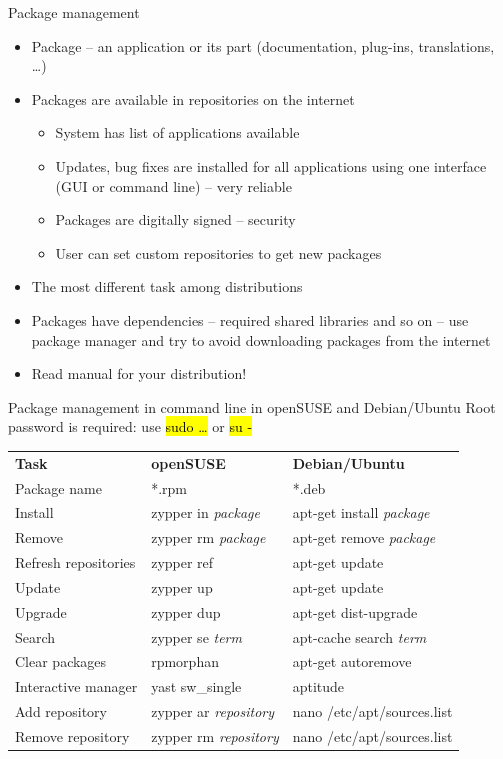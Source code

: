 \documentclass[compress, ucs, xelatex, 11pt, xcolor=svgnames,
  hyperref={
    bookmarks=true,
    unicode=true,
    colorlinks=true,
    pdftitle={Linux, command line and MetaCentrum},
    plainpages=false,
    pdfauthor={Vojtech Zeisek},
    pdfsubject={Course about use of Linux command line, writing shell scripts and using MetaCentrum of CESNET},
    pdfcreator={XeLaTeX},
    pdfkeywords={Linux, GNU, BASH, shell, command line, MetaCentrum},
    linkcolor=Red,
    anchorcolor=Blue,
    citecolor=Purple,
    filecolor=DodgerBlue,
    menucolor=DarkOrchid,
    urlcolor=DeepSkyBlue,
    pdftex},
  url={hyphens, lowtilde} %
  ]{beamer}
\renewcommand{\texttt}[1]{\hl{\ttfamily #1}}
\begin{document}
\begin{frame}{Package management}
\begin{itemize}
  \item Package -- an application or its part (documentation, plug-ins, translations, \ldots)
  \item Packages are available in repositories on the internet
  \begin{itemize}
    \item System has list of applications available
    \item Updates, bug fixes are installed for all applications using one interface (GUI or command line) -- very reliable
    \item Packages are digitally signed -- security
    \item User can set custom repositories to get new packages
  \end{itemize}
  \item The most different task among distributions
  \item Packages have dependencies -- required shared libraries and so on -- use package manager and try to avoid downloading packages from the internet
  \item \alert{Read manual for your distribution!}
\end{itemize}
\end{frame}

\begin{frame}{Package management in command line in openSUSE and Debian/Ubuntu}
Root password is required: use \texttt{sudo \ldots} or \texttt{su -}
\begin{center}
\begin{tabular}{lll}
\textbf{Task} & \textbf{openSUSE} & \textbf{Debian/Ubuntu}\\
Package name & *.rpm & *.deb\\
Install & zypper in \textit{package} & apt-get install \textit{package}\\
Remove & zypper rm \textit{package} & apt-get remove \textit{package}\\
Refresh repositories & zypper ref & apt-get update\\
Update & zypper up & apt-get update\\
Upgrade & zypper dup & apt-get dist-upgrade\\
Search & zypper se \textit{term} & apt-cache search \textit{term}\\
Clear packages & rpmorphan & apt-get autoremove\\
Interactive manager & yast sw\_single & aptitude\\
Add repository & zypper ar \textit{repository} & nano /etc/apt/sources.list\\
Remove repository & zypper rm \textit{repository} & nano /etc/apt/sources.list
\end{tabular}
\end{center}
\end{frame}
\end{document}
